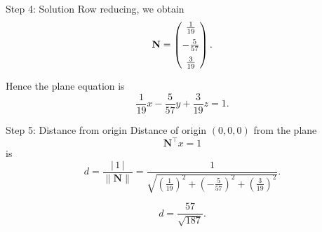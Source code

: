 \documentclass[12pt]{beamer}
\begin{document}
\begin{frame}{Step 4: Solution}
Row reducing, we obtain
\[
\mathbf{N} = \begin{pmatrix}\tfrac{1}{19}\\[6pt]-\tfrac{5}{57}\\[6pt]\tfrac{3}{19}\end{pmatrix}.
\]

Hence the plane equation is
\[
\frac{1}{19}x - \frac{5}{57}y + \frac{3}{19}z = 1.
\]
\end{frame}

\begin{frame}{Step 5: Distance from origin}
Distance of origin \((0,0,0)\) from the plane
\[
\mathbf{N}^{\!\top}x = 1
\]
is
\[
d = \frac{|\,1\,|}{\|\mathbf{N}\|}
= \frac{1}{\sqrt{\left(\tfrac{1}{19}\right)^2 + \left(-\tfrac{5}{57}\right)^2 + \left(\tfrac{3}{19}\right)^2}}.
\]

\[
d = \frac{57}{\sqrt{187}}.
\]
\end{frame}
\end{document}

